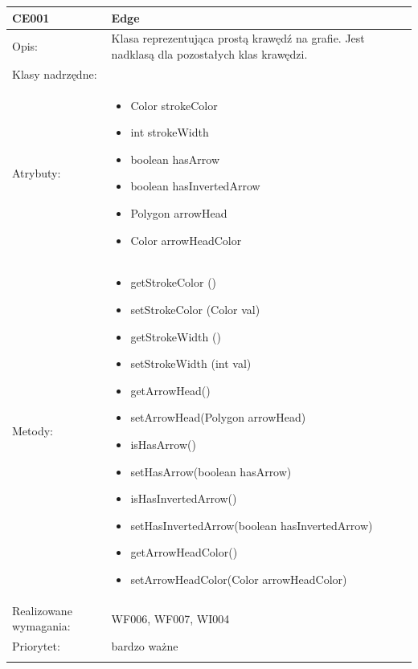 \documentclass[a4paper,10pt]{article}
\begin{document}
\begin{center}

\begin{longtable}{|m{3cm}|m{9cm}|} \hline

CE001 & Edge \\ \hline
Opis: &  Klasa reprezentująca prostą krawędź na grafie. Jest nadklasą dla pozostałych klas krawędzi.  \\ \hline
Klasy nadrzędne: &     \\ \hline
Atrybuty: & \begin{itemize}
\item Color strokeColor
\item  int strokeWidth 
\item boolean hasArrow
\item    boolean hasInvertedArrow
  \item  Polygon arrowHead
  \item Color arrowHeadColor
\end{itemize}
 \\ \hline
Metody: & \begin{itemize}
 \item    getStrokeColor () 
\item setStrokeColor (Color val)
  \item  getStrokeWidth () 
\item setStrokeWidth (int val) 
\item getArrowHead()
\item setArrowHead(Polygon arrowHead)
\item isHasArrow()
 \item setHasArrow(boolean hasArrow)
  \item isHasInvertedArrow()
\item setHasInvertedArrow(boolean hasInvertedArrow)
\item getArrowHeadColor()
 \item setArrowHeadColor(Color arrowHeadColor)
\end{itemize}
  \\ \hline
Realizowane wymagania: & WF006, WF007, WI004 \\ \hline
Priorytet: & bardzo ważne  \\ \hline

\multicolumn{2}{c}{} \\
 \hline


\end{longtable}
\end{center}
\end{document}

